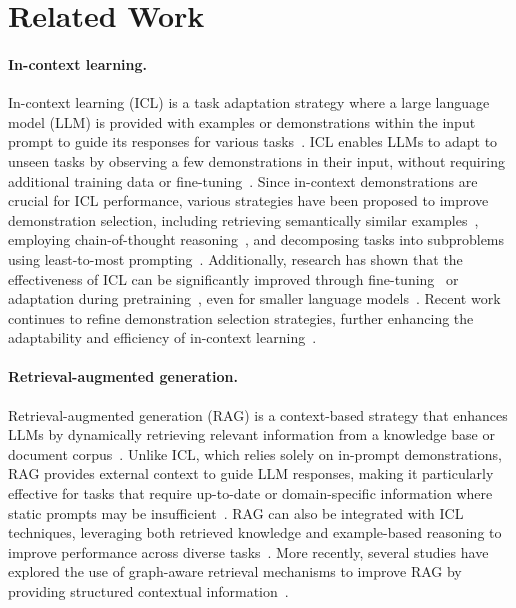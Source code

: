 \section{Related Work}
\paragraph{In-context learning.}
In-context learning (ICL) is a task adaptation strategy where a large language model (LLM) is provided with examples or demonstrations within the input prompt to guide its responses for various tasks~\cite{few_shot}. ICL enables LLMs to adapt to unseen tasks by observing a few demonstrations in their input, without requiring additional training data or fine-tuning~\cite{icl_survey}.
Since in-context demonstrations are crucial for ICL performance, various strategies have been proposed to improve demonstration selection, including retrieving semantically similar examples~\cite{LiuSZDCC22}, employing chain-of-thought reasoning~\cite{zero_shot_cot}, and decomposing tasks into subproblems using least-to-most prompting~\cite{ZhouSHWS0SCBLC23}. Additionally, research has shown that the effectiveness of ICL can be significantly improved through fine-tuning~\cite{WeiBZGYLDDL22} or adaptation during pretraining~\cite{metaicl}, even for smaller language models~\cite{SchickS21}. Recent work continues to refine demonstration selection strategies, further enhancing the adaptability and efficiency of in-context learning~\cite{LiuSZDCC22}.


\paragraph{Retrieval-augmented generation.}
Retrieval-augmented generation (RAG) is a context-based strategy that enhances LLMs by dynamically retrieving relevant information from a knowledge base or document corpus~\cite{rag}. Unlike ICL, which relies solely on in-prompt demonstrations, RAG provides external context to guide LLM responses, making it particularly effective for tasks that require up-to-date or domain-specific information where static prompts may be insufficient~\cite{rag_survey}.
RAG can also be integrated with ICL techniques, leveraging both retrieved knowledge and example-based reasoning to improve performance across diverse tasks~\cite{icl_survey}. More recently, several studies have explored the use of graph-aware retrieval mechanisms to improve RAG by providing structured contextual information~\cite{graphrag,gretriever}.



